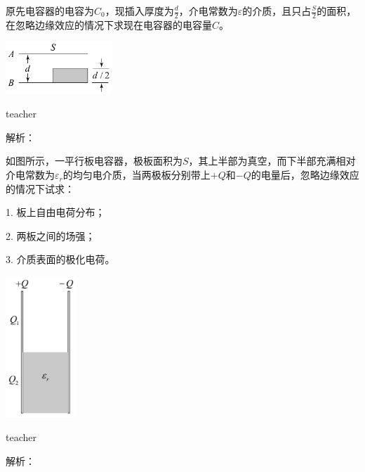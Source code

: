 \begin{example}

原先电容器的电容为$C_0$，现插入厚度为$\frac{d}{2}$，介电常数为$\varepsilon$的介质，且只占$\frac{S}{2}$的面积，在忽略边缘效应的情况下求现在电容器的电容量$C$。
\begin{flushright}
\includegraphics[width = 0.3\textwidth]{images/elec-problem-20.pdf} 
\end{flushright}
\begin{taggedblock}{teacher}

解析：
\end{taggedblock}
\end{example}


\begin{example}

如图所示，一平行板电容器，极板面积为$S$，其上半部为真空，而下半部充满相对介电常数为$\varepsilon_r$的均匀电介质，当两极板分别带上$+Q$和$−Q$的电量后，忽略边缘效应的情况下试求：

1. 板上自由电荷分布；

2. 两板之间的场强；

3. 介质表面的极化电荷。
\begin{flushright}
\includegraphics[width = 0.2\textwidth]{images/elec-problem-21.pdf} 
\end{flushright}

\begin{taggedblock}{teacher}

解析：
\end{taggedblock}
\end{example}
